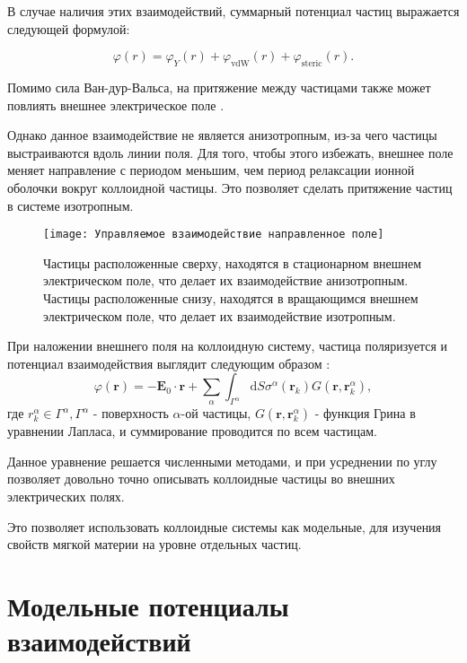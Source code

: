 В случае наличия этих взаимодействий, суммарный потенциал частиц выражается следующей формулой:

\begin{equation}
\varphi(r)=\varphi_{Y}(r)+\varphi_{\mathrm{vdW}}(r)+\varphi_{\mathrm{steric}}(r).
\end{equation}

Помимо сила Ван-дур-Вальса, на притяжение между частицами также может повлиять внешнее электрическое поле \cite{gel6}.

Однако данное взаимодействие не является анизотропным, из-за чего частицы выстраиваются вдоль линии поля. Для того, чтобы этого избежать, внешнее поле меняет направление с периодом меньшим, чем период релаксации ионной оболочки вокруг коллоидной частицы. Это позволяет сделать притяжение частиц в системе изотропным.

\begin{figure}[h]
\begin{center}
\texttt{[image: Управляемое взаимодействие направленное поле]}
\caption{Частицы расположенные сверху, находятся в стационарном внешнем электрическом поле, что делает их взаимодействие анизотропным. Частицы расположенные снизу, находятся в вращающимся  внешнем электрическом поле, что делает их взаимодействие изотропным.}
\label{risPolar}
\end{center}
\end{figure}

При наложении внешнего поля на коллоидную систему, частица поляризуется и потенциал взаимодействия выглядит следующим образом \cite{gel7}:
\begin{equation}
\varphi(\mathbf{r})=-\mathbf{E}_{0} \cdot \mathbf{r}+\sum_{\alpha} \int_{\Gamma^{\alpha}} \mathrm{d} S \sigma^{\alpha}\left(\mathbf{r}_{k}\right) G\left(\mathbf{r}, \mathbf{r}_{k}^{\alpha}\right),
\end{equation}
где $r_{k}^{\alpha} \in \Gamma^\alpha, \Gamma^\alpha$ - поверхность $\alpha$-ой частицы, $G\left(\mathbf{r}, \mathbf{r}_{k}^{\alpha}\right)$ - функция Грина в уравнении Лапласа, и суммирование проводится по всем частицам.

Данное уравнение решается численными методами, и при усреднении по углу позволяет довольно точно описывать коллоидные частицы во внешних электрических полях.

Это позволяет использовать коллоидные системы как модельные, для изучения свойств мягкой материи на уровне отдельных частиц. 

\section{Модельные потенциалы взаимодействий}

